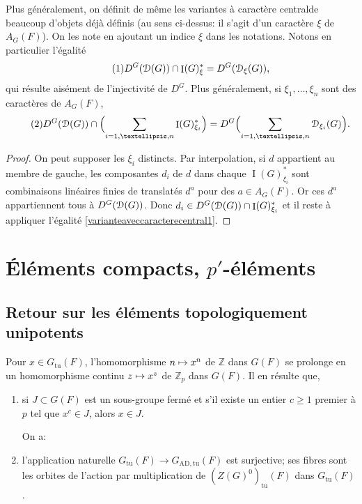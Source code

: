 \documentclass[11pt]{article}
\numberwithin{equation}{section}\providecommand{\og}{«\,}\providecommand{\fg}{\,»}
\let\mathcal \EuScript
\newcommand\mto{\mathchoice{\longmapsto}{\mapsto}{\mapsto}{\mapsto}}
\newcommand{\AD}{\mathrm{AD}}
\newcommand{\tu}{\mathrm{tu}}
\DeclareMathOperator{\rI}{I}
\newcommand{\cD}{\mathcal{D}}
\newcommand{\ZZ}{\mathbb{Z}}
\theoremstyle{plain}
\theoremstyle{definition}
\begin{document}
Plus généralement, on définit de même les variantes \og à caractère central\fg de beaucoup d'objets déjà définis (au sens ci-dessus: il s'agit d'un caractère $\xi$ de $A_{G}(F)$). On les note en ajoutant un indice $\xi$ dans les notations. Notons en particulier l'égalité%
\begin{equation}\tag{1}\label{varianteaveccaracterecentral1}
D^G(\cD(G))\cap \rI(G)^*_{\xi}=D^G(\cD_{\xi}(G)),
\end{equation}
qui résulte aisément de l'injectivité de $D^G$.
Plus généralement, si $\xi_{1},\dots,\xi_{n}$ sont des caractères de $A_{G}(F)$,
\begin{equation}\tag{2}\label{varianteaveccaracterecentral2}
D^G(\cD(G))\cap \Bigl(\sum_{i=1,\dots,n}\rI(G)^*_{\xi_{i}}\Bigr)=D^G\Bigl(\sum_{i=1,\dots,n}\cD_{\xi_{i}}(G)\Bigr).
\end{equation}

\begin{proof}
On peut supposer les $\xi_{i}$ distincts. Par interpolation, si $d$ appartient au membre de gauche, les composantes $d_{i}$ de $d$ dans chaque $\rI(G)^*_{\xi_{i}}$ sont combinaisons linéaires finies de translatés $d^{a}$ pour des $a\in A_{G}(F)$. Or ces $d^{a}$ appartiennent tous à $D^G(\cD(G))$. Donc $d_{i}\in D^G(\cD(G))\cap \rI(G)^*_{\xi_{i}}$ et il reste à appliquer l'égalité \eqref{varianteaveccaracterecentral1}.
\end{proof}

\section{Éléments compacts, \texorpdfstring{$p'$}{p'}-éléments}

\subsection{Retour sur les éléments topologiquement unipotents}\label{retour}
Pour $x\in G_{\tu}(F)$, l'homomorphisme $n\mto x^n$ de $\ZZ$ dans $G(F)$ se prolonge en un homomorphisme continu $z\mto x^z$ de $\ZZ_{p}$ dans $G(F)$. Il en résulte que,
\begin{enumerate}
\item\label{retour1}
si $J\subset G(F)$ est un sous-groupe fermé et s'il existe un entier $c\geq1$ premier à $p$ tel que $x^c\in J$, alors $x\in J$.

\noindent
On a:
\item\label{retour2}
l'application naturelle $G_{\tu}(F)\to G_{\AD,\tu}(F)$ est surjective; ses fibres sont les orbites de l'action par multiplication de $(Z(G)^0)_{\tu}(F)$ dans $G_{\tu}(F)$.
\end{enumerate}
\end{document}
